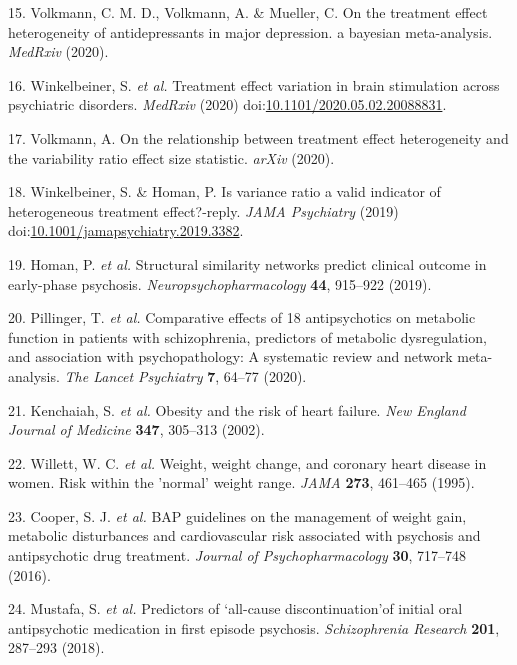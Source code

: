 \documentclass[9pt,english,,jou,floatsintext]{apa6}
\begin{document}
\hypertarget{ref-Volkmann2020}{}
15. Volkmann, C. M. D., Volkmann, A. \& Mueller, C. On the treatment
effect heterogeneity of antidepressants in major depression. a bayesian
meta-analysis. \emph{MedRxiv} (2020).

\hypertarget{ref-Winkelbeiner2020}{}
16. Winkelbeiner, S. \emph{et al.} Treatment effect variation in brain
stimulation across psychiatric disorders. \emph{MedRxiv} (2020)
doi:\href{https://doi.org/10.1101/2020.05.02.20088831}{10.1101/2020.05.02.20088831}.

\hypertarget{ref-Volkmann2020a}{}
17. Volkmann, A. On the relationship between treatment effect
heterogeneity and the variability ratio effect size statistic.
\emph{arXiv} (2020).

\hypertarget{ref-Winkelbeiner2019b}{}
18. Winkelbeiner, S. \& Homan, P. Is variance ratio a valid indicator of
heterogeneous treatment effect?-reply. \emph{JAMA Psychiatry} (2019)
doi:\href{https://doi.org/10.1001/jamapsychiatry.2019.3382}{10.1001/jamapsychiatry.2019.3382}.

\hypertarget{ref-Homan2019a}{}
19. Homan, P. \emph{et al.} Structural similarity networks predict
clinical outcome in early-phase psychosis.
\emph{Neuropsychopharmacology} \textbf{44}, 915--922 (2019).

\hypertarget{ref-Pillinger2020}{}
20. Pillinger, T. \emph{et al.} Comparative effects of 18 antipsychotics
on metabolic function in patients with schizophrenia, predictors of
metabolic dysregulation, and association with psychopathology: A
systematic review and network meta-analysis. \emph{The Lancet
Psychiatry} \textbf{7}, 64--77 (2020).

\hypertarget{ref-Kenchaiah2002}{}
21. Kenchaiah, S. \emph{et al.} Obesity and the risk of heart failure.
\emph{New England Journal of Medicine} \textbf{347}, 305--313 (2002).

\hypertarget{ref-Willett1995}{}
22. Willett, W. C. \emph{et al.} Weight, weight change, and coronary
heart disease in women. Risk within the 'normal' weight range.
\emph{JAMA} \textbf{273}, 461--465 (1995).

\hypertarget{ref-Cooper2016}{}
23. Cooper, S. J. \emph{et al.} BAP guidelines on the management of
weight gain, metabolic disturbances and cardiovascular risk associated
with psychosis and antipsychotic drug treatment. \emph{Journal of
Psychopharmacology} \textbf{30}, 717--748 (2016).

\hypertarget{ref-Mustafa2018}{}
24. Mustafa, S. \emph{et al.} Predictors of `all-cause
discontinuation'of initial oral antipsychotic medication in first
episode psychosis. \emph{Schizophrenia Research} \textbf{201}, 287--293
(2018).
\end{document}
